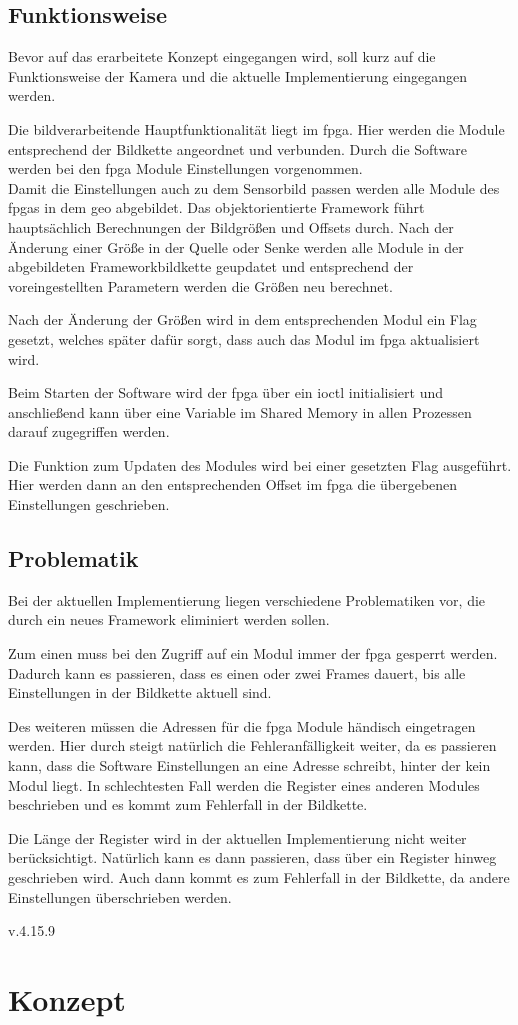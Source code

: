 \subsection{Funktionsweise}
Bevor auf das erarbeitete Konzept eingegangen wird, soll kurz auf die Funktionsweise der Kamera und die aktuelle Implementierung eingegangen werden.

Die bildverarbeitende Hauptfunktionalität liegt im \ac{fpga}. Hier werden die Module entsprechend der Bildkette angeordnet und verbunden. Durch die Software werden bei den \ac{fpga} Module Einstellungen vorgenommen.\\


Damit die Einstellungen auch zu dem Sensorbild passen werden alle Module des \ac{fpga}s in dem \ac{geo} abgebildet. Das objektorientierte Framework führt hauptsächlich Berechnungen der Bildgrößen und Offsets durch. Nach der Änderung einer Größe in der Quelle oder Senke werden alle Module in der abgebildeten Frameworkbildkette geupdatet und entsprechend der voreingestellten Parametern werden die Größen neu berechnet. 

Nach der Änderung der Größen wird in dem entsprechenden Modul ein Flag gesetzt, welches später dafür sorgt, dass auch das Modul im \ac{fpga} aktualisiert wird.

Beim Starten der Software wird der \ac{fpga} über ein \ac{ioctl} initialisiert und anschließend kann über eine Variable im Shared Memory in allen Prozessen darauf zugegriffen werden. 

Die Funktion zum Updaten des Modules wird bei einer gesetzten Flag ausgeführt. Hier werden dann an den entsprechenden Offset im \ac{fpga} die übergebenen Einstellungen geschrieben. 


\subsection{Problematik}
Bei der aktuellen Implementierung liegen verschiedene Problematiken vor, die durch ein neues Framework eliminiert werden sollen.

Zum einen muss bei den Zugriff auf ein Modul immer der \ac{fpga} gesperrt werden. Dadurch kann es passieren, dass es einen oder zwei Frames dauert, bis alle Einstellungen in der Bildkette aktuell sind.

Des weiteren müssen die Adressen für die \ac{fpga} Module händisch eingetragen werden. Hier durch steigt natürlich die Fehleranfälligkeit weiter, da es passieren kann, dass die Software Einstellungen an eine Adresse schreibt, hinter der kein Modul liegt. In schlechtesten Fall werden die Register eines anderen Modules beschrieben und es kommt zum Fehlerfall in der Bildkette.


Die Länge der Register wird in der aktuellen Implementierung nicht weiter berücksichtigt. Natürlich kann es dann passieren, dass über ein Register hinweg geschrieben wird. Auch dann kommt es zum Fehlerfall in der Bildkette, da andere Einstellungen überschrieben werden. 
 
v.4.15.9


\section{Konzept}
